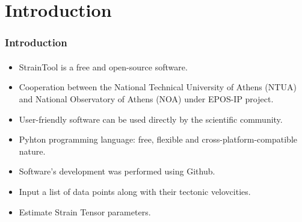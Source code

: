 \section{Introduction}
 

\begin{frame}
  \frametitle{Introduction}
  \framesubtitle{}
  \label{ch1:intro}
  
  \begin{itemize}
    \item StrainTool is a free and open-source software.
    
    \item Cooperation between the National Technical University of Athens (NTUA) and National Observatory of Athens (NOA) under EPOS-IP project.
    
    \item User-friendly software can be used directly by the scientific community.
    
    \item Pyhton programming language: free, flexible and cross-platform-compatible nature.
    
    \item Software's development was performed using Github.
    
    \item Input a list of data points along with their tectonic velovcities.
    
    \item Estimate Strain Tensor parameters.
  \end{itemize}
  
  
\end{frame}
\note{}





